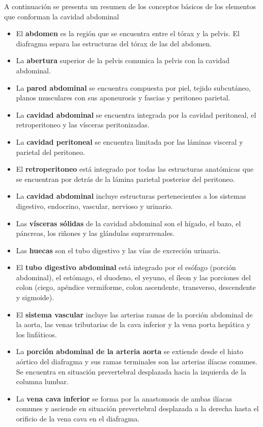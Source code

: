 A continuación se presenta un resumen de los conceptos básicos de los elementos 
que conforman la cavidad abdominal %
\begin{itemize}
	\item El \textbf{abdomen} es la región que se encuentra entre el tórax y la pelvis. El diafragma separa las estructuras del tórax de las del abdomen. 
	\item La \textbf{abertura} superior de la pelvis comunica la pelvis con la cavidad abdominal.
	\item La \textbf{pared abdominal} se encuentra compuesta por piel, tejido subcutáneo, planos musculares con sus aponeurosis y fascias y peritoneo parietal.
	\item La \textbf{cavidad abdominal} se encuentra integrada por la cavidad peritoneal, el retroperitoneo y las vísceras peritonizadas.
	\item La \textbf{cavidad peritoneal} se encuentra limitada por las láminas visceral y parietal del peritoneo.
	\item El \textbf{retroperitoneo} está integrado por todas las estructuras anatómicas que se encuentran por detrás de la lámina parietal posterior del peritoneo.
	\item La \textbf{cavidad abdominal} incluye estructuras pertenecientes a los sistemas digestivo, endocrino, vascular, nervioso y urinario.
	\item Las \textbf{vísceras sólidas} de la cavidad abdominal son el hígado, el bazo, el páncreas, los riñones y las glándulas suprarrenales.
	\item Las \textbf{huecas} son el tubo digestivo y las vías de excreción urinaria. 
	\item El \textbf{tubo digestivo abdominal} está integrado por el esófago (porción abdominal), el estómago, el duodeno, el yeyuno, el íleon y las porciones del colon (ciego, apéndice vermiforme, colon ascendente, transverso, descendente y sigmoide).
	\item El \textbf{sistema vascular} incluye las arterias ramas de la porción abdominal de la aorta, las venas tributarias de la cava inferior y la vena porta hepática y los linfáticos.
	\item La \textbf{porción abdominal de la arteria aorta} se extiende desde el hiato aórtico del diafragma y sus ramas terminales son las arterias ilíacas comunes. Se encuentra en situación prevertebral desplazada hacia la izquierda de la columna lumbar. 
	\item La \textbf{vena cava inferior} se forma por la anastomosis de ambas ilíacas comunes y asciende en situación prevertebral desplazada a la derecha hasta el orificio de la vena cava en el diafragma.

\end{itemize}

